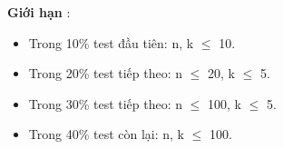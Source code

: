\textbf{      Giới hạn     }   :  
\begin{itemize}
	\item     Trong 10\% test đầu tiên: n, k  $\le$  10.   
	\item     Trong 20\% test tiếp theo: n  $\le$  20, k  $\le$  5.   
	\item     Trong 30\% test tiếp theo: n  $\le$  100, k  $\le$  5.   
	\item     Trong 40\% test còn lại: n, k  $\le$  100.   
\end{itemize}

